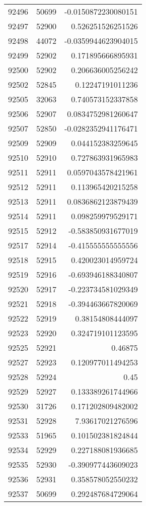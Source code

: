 \begin{tabular}{r | r | r}
92496 & 50699 & -0.0150872230080151 \\
92497 & 52900 & 0.526251526251526 \\
92498 & 44072 & -0.0359944623904015 \\
92499 & 52902 & 0.171895666895931 \\
92500 & 52902 & 0.206636005256242 \\
92502 & 52845 & 0.12247191011236 \\
92505 & 32063 & 0.740573152337858 \\
92506 & 52907 & 0.0834752981260647 \\
92507 & 52850 & -0.0282352941176471 \\
92509 & 52909 & 0.044152383259645 \\
92510 & 52910 & 0.727863931965983 \\
92511 & 52911 & 0.0597043578421961 \\
92512 & 52911 & 0.113965420215258 \\
92513 & 52911 & 0.0836862123879439 \\
92514 & 52911 & 0.098259979529171 \\
92515 & 52912 & -0.583850931677019 \\
92517 & 52914 & -0.415555555555556 \\
92518 & 52915 & 0.420023014959724 \\
92519 & 52916 & -0.693946188340807 \\
92520 & 52917 & -0.223734581029349 \\
92521 & 52918 & -0.394463667820069 \\
92522 & 52919 & 0.38154808444097 \\
92523 & 52920 & 0.324719101123595 \\
92525 & 52921 & 0.46875 \\
92527 & 52923 & 0.120977011494253 \\
92528 & 52924 & 0.45 \\
92529 & 52927 & 0.133389261744966 \\
92530 & 31726 & 0.171202809482002 \\
92531 & 52928 & 7.93617021276596 \\
92533 & 51965 & 0.101502381824844 \\
92534 & 52929 & 0.227188081936685 \\
92535 & 52930 & -0.390977443609023 \\
92536 & 52931 & 0.358578052550232 \\
92537 & 50699 & 0.292487684729064 \\

\end{tabular}
